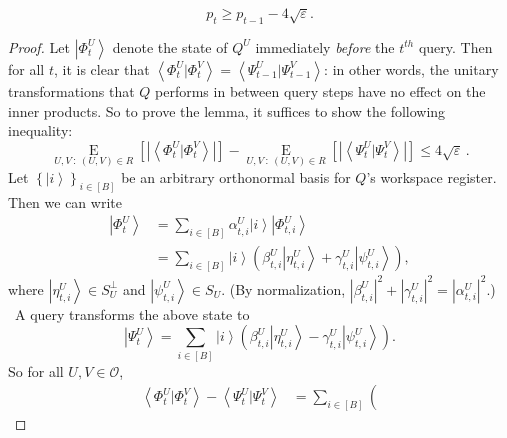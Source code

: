 \begin{lemma}
\label{innerprod}%
\[
p_{t}\geq p_{t-1}-4\sqrt{\varepsilon}.
\]

\end{lemma}

\begin{proof}
Let $\left\vert \Phi_{t}^{U}\right\rangle $ denote the state of $Q^{U}%
$ immediately \emph{before} the $t^{th}$ query. Then for all $t$, it is
clear that $\left\langle \Phi_{t}^{U}|\Phi_{t}^{V}\right\rangle =\left\langle
\Psi_{t-1}^{U}|\Psi_{t-1}^{V}\right\rangle $: in other words, the unitary
transformations that $Q$ performs in between query steps have no effect on
the inner products. So to prove the lemma, it suffices to show the following
inequality:%
\begin{equation}
\operatorname*{E}_{U,V~:~\left(  U,V\right)  \in R}\left[  \left\vert
\left\langle \Phi_{t}^{U}|\Phi_{t}^{V}\right\rangle \right\vert \right]
-\operatorname*{E}_{U,V~:~\left(  U,V\right)  \in R}\left[  \left\vert
\left\langle \Psi_{t}^{U}|\Psi_{t}^{V}\right\rangle \right\vert \right]
\leq4\sqrt{\varepsilon}\,. \tag{*}%
\end{equation}
Let $\left\{  \left\vert i\right\rangle \right\}  _{i\in\left[  B\right]  }%
$ be an arbitrary orthonormal basis for $Q$'s workspace register. Then we
can write%
\begin{align*}
\left\vert \Phi_{t}^{U}\right\rangle  &  =\sum_{i\in\left[  B\right]  }%
\alpha_{t,i}^{U}\left\vert i\right\rangle \left\vert \Phi_{t,i}^{U}%
\right\rangle \\
&  =\sum_{i\in\left[  B\right]  }\left\vert i\right\rangle \left(  \beta
_{t,i}^{U}\left\vert \eta_{t,i}^{U}\right\rangle +\gamma_{t,i}^{U}\left\vert
\psi_{t,i}^{U}\right\rangle \right)  ,
\end{align*}
where $\left\vert \eta_{t,i}^{U}\right\rangle \in S_{U}^{\bot}$ and
$\left\vert \psi_{t,i}^{U}\right\rangle \in S_{U}$. (By normalization,
$\left\vert \beta_{t,i}^{U}\right\vert ^{2}+\left\vert \gamma_{t,i}%
^{U}\right\vert ^{2}=\left\vert \alpha_{t,i}^{U}\right\vert ^{2}$.) \ A query
transforms the above state to%
\[
\left\vert \Psi_{t}^{U}\right\rangle =\sum_{i\in\left[  B\right]  }\left\vert
i\right\rangle \left(  \beta_{t,i}^{U}\left\vert \eta_{t,i}^{U}\right\rangle
-\gamma_{t,i}^{U}\left\vert \psi_{t,i}^{U}\right\rangle \right)  .
\]
So for all $U,V\in\mathcal{O}$,%
\begin{align*}
\left\langle \Phi_{t}^{U}|\Phi_{t}^{V}\right\rangle -\left\langle \Psi_{t}%
^{U}|\Psi_{t}^{V}\right\rangle  &  =\sum_{i\in\left[  B\right]  }\left(

\end{align*}
\end{proof}
